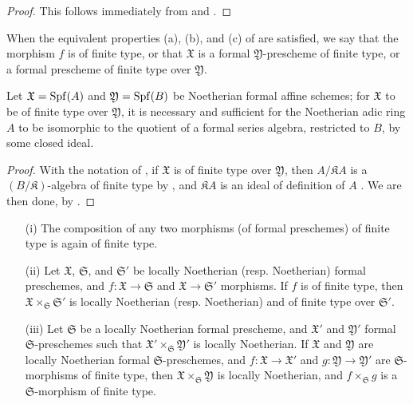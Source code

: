 \begin{proof}
This follows immediately from  and .
\end{proof}

\begin{definition}[10.13.3]
\label{I.10.13.3}
When the equivalent properties (a), (b), and (c) of  are satisfied, we say that the morphism $f$ is of finite type, or that $\mathfrak{X}$ is a formal $\mathfrak{Y}$-prescheme of finite type, or a formal prescheme of finite type over $\mathfrak{Y}$.
\end{definition}

\begin{corollary}[10.13.4]
\label{I.10.13.4}
Let $\mathfrak{X}=\operatorname{Spf}(A)$ and $\mathfrak{Y}=\operatorname{Spf}(B)$ be Noetherian formal affine schemes;
for $\mathfrak{X}$ to be of finite type over $\mathfrak{Y}$, it is necessary and sufficient for the Noetherian adic ring $A$ to be isomorphic to the quotient of a formal series algebra, restricted to $B$, by some closed ideal.
\end{corollary}

\begin{proof}
With the notation of , if $\mathfrak{X}$ is of finite type over $\mathfrak{Y}$, then $A/\mathfrak{K}A$ is a $(B/\mathfrak{K})$-algebra of finite type by , and $\mathfrak{K}A$ is an ideal of definition of $A$ .
We are then done, by .
\end{proof}

\begin{proposition}[10.13.5]
\label{I.10.13.5}
\medskip\noindent
\begin{enumerate}
  \item[\rm{(i)}] The composition of any two morphisms (of formal preschemes) of finite type is again of finite type.
  \item[\rm{(ii)}] Let $\mathfrak{X}$, $\mathfrak{S}$, and $\mathfrak{S}'$ be locally Noetherian (resp. Noetherian) formal preschemes, and $f:\mathfrak{X}\to\mathfrak{S}$ and $\mathfrak{X}\to\mathfrak{S}'$ morphisms.
    If $f$ is of finite type, then $\mathfrak{X}\times_\mathfrak{S}\mathfrak{S}'$ is locally Noetherian (resp. Noetherian) and of finite type over $\mathfrak{S}'$.
  \item[\rm{(iii)}] Let $\mathfrak{S}$ be a locally Noetherian formal prescheme, and $\mathfrak{X}'$ and $\mathfrak{Y}'$ formal $\mathfrak{S}$-preschemes such that $\mathfrak{X}'\times_\mathfrak{S}\mathfrak{Y}'$ is locally Noetherian.
    If $\mathfrak{X}$ and $\mathfrak{Y}$ are locally Noetherian formal $\mathfrak{S}$-preschemes, and $f:\mathfrak{X}\to\mathfrak{X}'$ and $g:\mathfrak{Y}\to\mathfrak{Y}'$ are $\mathfrak{S}$-morphisms of finite type, then $\mathfrak{X}\times_\mathfrak{S}\mathfrak{Y}$ is locally Noetherian, and $f\times_\mathfrak{S}g$ is a $\mathfrak{S}$-morphism of finite type.
\end{enumerate}
\end{proposition}

